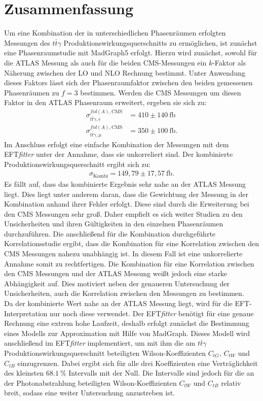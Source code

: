 \chapter{Zusammenfassung}
Um eine Kombination der in unterschiedlichen Phasenräumen erfolgten Messungen des $t\bar{t}\gamma$ Produktionswirkungsquerschnitts zu ermöglichen, ist zunächst eine Phasenraumstudie mit MadGraph5 erfolgt. Hierzu wird zunächst, sowohl für die ATLAS Messung als auch für die beiden CMS-Messungen ein $k$-Faktor als Näherung zwischen der LO und NLO Rechnung bestimmt. Unter Anwendung dieses Faktors lässt sich der Phasenraumfaktor zwischen den beiden gemessenen Phasenräumen zu $f=3$ bestimmen. Werden die CMS Messungen um diesen Faktor in den ATLAS Phasenraum erweitert, ergeben sie sich zu:
\begin{align*}
  \sigma^{fid(A), \text{CMS}}_{t\bar{t}\gamma, e} &= 410 \pm 140~ \si{\femto\barn}\\
  \sigma^{fid(A), \text{CMS}}_{t\bar{t}\gamma, \mu} &= 350 \pm 100~ \si{\femto\barn}.
\end{align*}
Im Anschluss erfolgt eine einfache Kombination der Messungen mit dem EFT\textit{fitter} unter der Annahme, dass sie unkorreliert sind. Der kombinierte Produktionswirkungsquerschnitt ergibt sich zu:
\begin{align*}
  \sigma_{\text{Kombi}} = 149,79 \pm 17,57~ \si{\femto\barn}.
\end{align*}
Es fällt auf, dass das kombinierte Ergebnis sehr nahe an der ATLAS Messung liegt. Dies liegt unter anderem daran, dass die Gewichtung der Messung in der Kombination anhand ihrer Fehler erfolgt. Diese sind durch die Erweiterung bei den CMS Messungen sehr groß. Daher empfielt es sich weiter Studien zu den Unsicherheiten und ihren Gültigkeiten in den einzelnen Phasenräumen durchzuführen. Die anschließend für die Kombination durchgeführte Korrelationsstudie ergibt, dass die Kombination für eine Korrelation zwischen den CMS Messungen nahezu unabhängig ist. In diesem Fall ist eine unkorrelierte Annahme somit zu rechtfertigen. Die Kombination für eine Korrelation zwischen den CMS Messungen und der ATLAS Messung weißt jedoch eine starke Abhängigkeit auf. Dies motiviert neben der genaueren Untersuchung der Unsicherheiten, auch die Korrelation zwischen den Messungen zu bestimmen.\\
Da der kombinierte Wert nahe an der ATLAS Messung liegt, wird für die EFT-Interpretation nur noch diese verwendet. Der EFT\textit{fitter} benötigt für eine genaue Rechnung eine extrem hohe Laufzeit, deshalb erfolgt zunächst die Bestimmung eines Modells zur Approximation mit Hilfe von MadGraph. Dieses Modell wird anschließend im EFT\textit{fitter} implementiert, um mit ihm die am $t\bar{t}\gamma$ Produktionswirkungsquerschnitt beteiligten Wilson-Koeffizienten $C_{tG}$, $C_{tW}$ und $C_{tB}$ einzugrenzen. Dabei ergibt sich für alle drei Koeffizienten eine Verträglichkeit des kleinsten $\SI{68.1}{\percent}$ Intervalls mit der Null. Die Intervalle sind jedoch für die an der Photonabstrahlung beteiligten Wilson-Koeffizienten $C_{tW}$ und $C_{tB}$ relativ breit, sodass eine weiter Untersuchung anzustreben ist.
